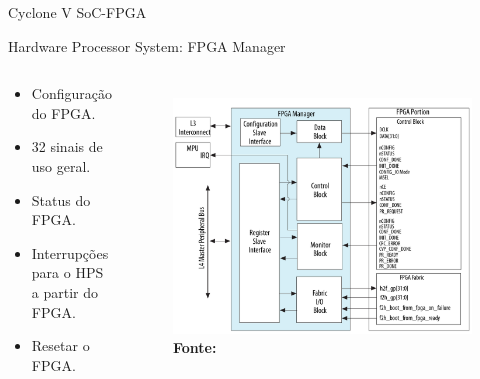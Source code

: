 \documentclass[10pt]{beamer}
\begin{document}
\begin{frame}{Cyclone V SoC-FPGA}
	\begin{alertblock}{Hardware Processor System: FPGA Manager}
		\begin{columns}
			\begin{alertblock}{}
				\begin{itemize}
					\setlength\itemsep{0.8em}
					\item Configuração do FPGA.
					\item 32 sinais de uso geral.
					\item Status do FPGA.
					\item Interrupções para o HPS a partir do FPGA.
					\item Resetar o FPGA.
				\end{itemize}
			\end{alertblock}
			\begin{figure}[h]
				\begin{center}
					\includegraphics[scale=0.18]{imagens/fpgamanager.png}\\
					{\footnotesize \textbf{Fonte:}}
				\end{center}
				\label{fig:fpgamanager}
			\end{figure}
		\end{columns}
	\end{alertblock}
\end{frame}
\end{document}
